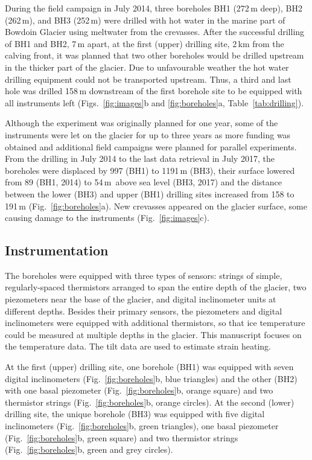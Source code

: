\documentclass[utf8]{article}
\begin{document}
    During the field campaign in July 2014, three boreholes BH1 (272\,m deep),
    BH2 (262\,m), and BH3 (252\,m)
    were drilled with hot water in the marine part of Bowdoin Glacier
    using meltwater from the crevasses. After the successful drilling of BH1
    and BH2, 7\,m apart, at the first (upper) drilling site, 2\,km from the
    calving front, it was planned that two other boreholes would be drilled
    upstream in the thicker part of the glacier. Due to unfavourable weather the
    hot water drilling equipment could not be transported upstream.
    Thus, a third
    and last hole was drilled 158\,m downstream of the first borehole site
    to be equipped with all instruments left (Figs.~\ref{fig:images}b and
    \ref{fig:boreholes}a, Table~\ref{tab:drilling}).

    Although the experiment was originally planned for one year, some of the
    instruments were let on the glacier for up to three years as more funding
    was obtained and additional field campaigns were planned for parallel
    experiments. From the drilling in July 2014 to the last data retrieval in
    July 2017, the boreholes were displaced by 997 (BH1) to 1191\,m (BH3),
    their surface lowered from 89 (BH1, 2014) to 54\,m~above sea level
    (BH3, 2017) and
    the distance between the lower (BH3) and upper (BH1) drilling sites
    increased from 158 to 191\,m (Fig.~\ref{fig:boreholes}a). New crevasses
    appeared on the glacier surface, some causing damage to the instruments
    (Fig.~\ref{fig:images}c).


\subsection{Instrumentation}

    The boreholes were equipped with three types of sensors: strings of simple,
    regularly-spaced thermistors arranged to span the entire depth of the
    glacier, two piezometers near the base of the glacier, and digital
    inclinometer units at different depths. Besides their primary sensors, the
    piezometers and digital inclinometers were equipped with additional
    thermistors, so that ice temperature could be measured at multiple depths
    in the glacier. This manuscript focuses on the temperature data. The tilt
    data are used to estimate strain heating.

    At the first (upper) drilling site, one borehole (BH1) was equipped with
    seven digital inclinometers (Fig.~\ref{fig:boreholes}b, blue triangles) and
    the other (BH2) with one basal piezometer (Fig.~\ref{fig:boreholes}b,
    orange square) and two thermistor strings (Fig.~\ref{fig:boreholes}b,
    orange circles). At the second (lower) drilling site, the unique
    borehole (BH3) was equipped with five digital inclinometers
    (Fig.~\ref{fig:boreholes}b, green triangles), one basal piezometer
    (Fig.~\ref{fig:boreholes}b, green square) and two thermistor strings
    (Fig.~\ref{fig:boreholes}b, green and grey circles).
\end{document}
